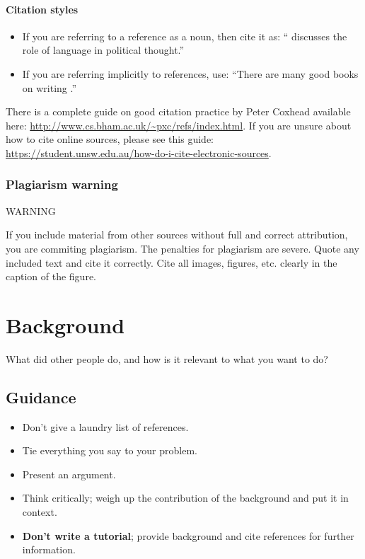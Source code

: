 \documentclass{l4proj}
\begin{document}
\subsubsection{Citation styles}

\begin{itemize}
\item If you are referring to a reference as a noun, then cite it as: ``\citet{Orw68} discusses the role of language in political thought.''
\item If you are referring implicitly to references, use: ``There are many good books on writing \citep{Orw68, Wil09, Pin15}.''
\end{itemize}

There is a complete guide on good citation practice by Peter Coxhead available here: \url{http://www.cs.bham.ac.uk/~pxc/refs/index.html}. 
If you are unsure about how to cite online sources, please see this guide: \url{https://student.unsw.edu.au/how-do-i-cite-electronic-sources}.

\subsection{Plagiarism warning}

\begin{highlight_title}{WARNING}
    
    If you include material from other sources without full and correct attribution, you are commiting plagiarism. The penalties for plagiarism are severe.
    Quote any included text and cite it correctly. Cite all images, figures, etc. clearly in the caption of the figure.
\end{highlight_title}


\chapter{Background}
What did other people do, and how is it relevant to what you want to do?
\section{Guidance}
\begin{itemize}    
    \item
      Don't give a laundry list of references.
    \item
      Tie everything you say to your problem.
    \item
      Present an argument.
    \item Think critically; weigh up the contribution of the background and put it in context.    
    \item
      \textbf{Don't write a tutorial}; provide background and cite
      references for further information.
\end{itemize}
\end{document}
